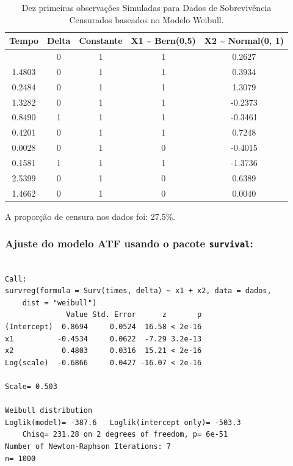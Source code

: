 \documentclass[
  12pt,
  letterpaper,
  DIV=11,
  numbers=noendperiod]{scrreprt}
\begin{document}
\begin{longtable}[]{@{}ccccc@{}}

\caption{\label{tbl-SIMULweibAFT}Dez primeiras observações Simuladas
para Dados de Sobrevivência Censurados baseados no Modelo Weibull.}

\tabularnewline

\toprule\noalign{}
Tempo & Delta & Constante & X1 \textasciitilde{} Bern(0,5) & X2
\textasciitilde{} Normal(0, 1) \\
\midrule\noalign{}
\endhead
\bottomrule\noalign{}
\endlastfoot
0.8706 & 0 & 1 & 1 & 0.2627 \\
1.4803 & 0 & 1 & 1 & 0.3934 \\
0.2484 & 0 & 1 & 1 & 1.3079 \\
1.3282 & 0 & 1 & 1 & -0.2373 \\
0.8490 & 1 & 1 & 1 & -0.3461 \\
0.4201 & 0 & 1 & 1 & 0.7248 \\
0.0028 & 0 & 1 & 0 & -0.4015 \\
0.1581 & 1 & 1 & 1 & -1.3736 \\
2.5399 & 0 & 1 & 0 & 0.6389 \\
1.4662 & 0 & 1 & 0 & 0.0040 \\

\end{longtable}

A proporção de censura nos dados foi: 27.5\%.

\subsubsection{\texorpdfstring{Ajuste do modelo ATF usando o pacote
\texttt{survival}:}{Ajuste do modelo ATF usando o pacote survival:}}\label{ajuste-do-modelo-atf-usando-o-pacote-survival-1}

\begin{verbatim}

Call:
survreg(formula = Surv(times, delta) ~ x1 + x2, data = dados, 
    dist = "weibull")
              Value Std. Error      z       p
(Intercept)  0.8694     0.0524  16.58 < 2e-16
x1          -0.4534     0.0622  -7.29 3.2e-13
x2           0.4803     0.0316  15.21 < 2e-16
Log(scale)  -0.6866     0.0427 -16.07 < 2e-16

Scale= 0.503 

Weibull distribution
Loglik(model)= -387.6   Loglik(intercept only)= -503.3
    Chisq= 231.28 on 2 degrees of freedom, p= 6e-51 
Number of Newton-Raphson Iterations: 7 
n= 1000 
\end{verbatim}
\end{document}
